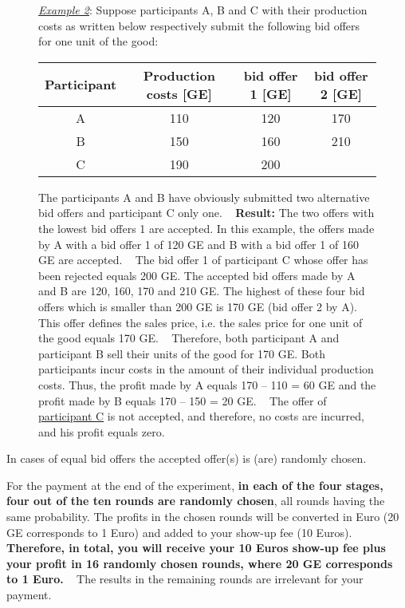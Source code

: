 \documentclass[11pt]{scrartcl}
\begin{document}
\begin{figure}[h!] 
	\begin{minipage}[t]{1\linewidth} 
		\begin{tcolorbox}[colback=pink,arc=0pt,colframe=black!25]
			\underline{\textit{Example 2}}: Suppose participants A, B and C with their production costs as written below respectively submit the following bid offers for one unit of the good:
			\begin{center}
				\begin{tabular}{c|ccc}
					Participant & Production costs [GE] & bid offer 1 [GE]	& bid offer 2 [GE] \\
					\hline
					A			& 110				 	& 120 				&	170 \\
					B			& 150	 				& 160				& 	210 \\
					C			& 190					& 200
				\end{tabular} \bigbreak	
			\end{center}	
			The participants A and B have obviously submitted two alternative bid offers and participant C only one.  ~\medbreak
			\textbf{Result:} The two offers with the lowest bid offers 1 are accepted. In this example, the offers made by A with a bid offer 1 of 120 GE and B with a bid offer 1 of 160 GE are accepted. ~\medbreak
			The bid offer 1 of participant C whose offer has been rejected equals 200 GE. The accepted bid offers made by A and B are 120, 160, 170 and 210 GE. The highest of these four bid offers which is smaller than 200 GE is 170 GE (bid offer 2 by A). This offer defines the sales price, i.e. the sales price for one unit of the good equals 170 GE. ~\medbreak
			Therefore, both participant A and participant B sell their units of the good for 170 GE. Both participants incur costs in the amount of their individual production costs. Thus, the profit made by A equals 170 – 110 = 60 GE and the profit made by B equals 170 – 150 = 20 GE. ~\medbreak		
			The offer of \underline{participant C} is not accepted, and therefore, no costs are incurred, and his profit equals zero.   
		\end{tcolorbox} 		
	\end{minipage}  
\end{figure}



In cases of equal bid offers the accepted offer(s) is (are) randomly chosen.



For the payment at the end of the experiment, \textbf{in each of the four stages, four out of the ten rounds are randomly chosen}, all rounds having the same probability. The profits in the chosen rounds will be converted in Euro (20 GE corresponds to 1 Euro) and added to your show-up fee (10 Euros). \textbf{Therefore, in total, you will receive your 10 Euros show-up fee plus your profit in 16 randomly chosen rounds, where 20 GE corresponds to 1 Euro.} ~\bigbreak
The results in the remaining rounds are irrelevant for your payment.
\end{document}
